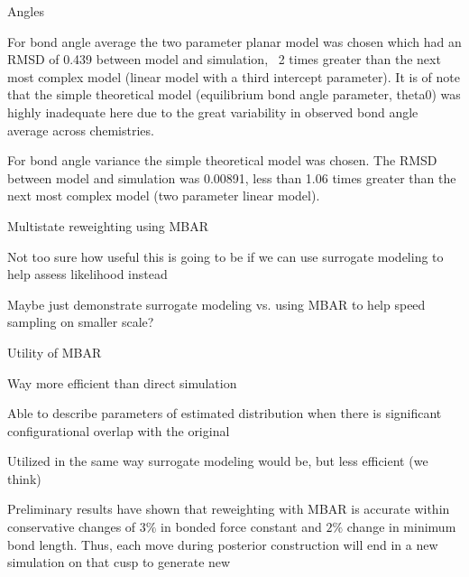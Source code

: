 \documentclass{report}
\begin{document}
\begin{outline}
\begin{outline}
\begin{outline}
\begin{outline}
\begin{outline}
\begin{outline}
\begin{outline}
\begin{outline}
{           \end{outline}
           \item{Angles}
           \begin{outline}
            \item{For bond angle average the two parameter planar model was chosen which had an RMSD of 0.439 between model and simulation, 
                  ~2 times greater than the next most complex model (linear model with a third intercept parameter). It is of note that the 
                  simple theoretical model (equilibrium bond angle parameter, theta0) was highly inadequate here due to the great variability 
                  in observed bond angle average across chemistries.}
            \item{For bond angle variance the simple theoretical model was chosen. The RMSD between model and simulation was 0.00891, less than 
                  1.06 times greater than the next most complex model (two parameter linear model).}
           \end{outline} 
          \end{outline} 
         \end{outline}
        \end{outline}
      \item{Multistate reweighting using MBAR}
      \begin{outline}
        \item{Not too sure how useful this is going to be if we can use surrogate modeling to help assess likelihood instead}
        \item{Maybe just demonstrate surrogate modeling vs. using MBAR to help speed sampling on smaller scale?}
        \item{Utility of MBAR}
        \begin{outline}
          \item{Way more efficient than direct simulation}
          \item{Able to describe parameters of estimated distribution when there is significant configurational overlap with the original}
        \end{outline}
        \item{Utilized in the same way surrogate modeling would be, but less efficient (we think)}
        \item{Preliminary results have shown that reweighting with MBAR is accurate within conservative changes of $3\%$ in bonded force constant and $2\%$
                change in minimum bond length. Thus, each move during posterior construction will end in a new simulation on that cusp to generate new 
}
\end{outline}
\end{outline}
\end{outline}
\end{outline}
\end{outline}
\end{document}
